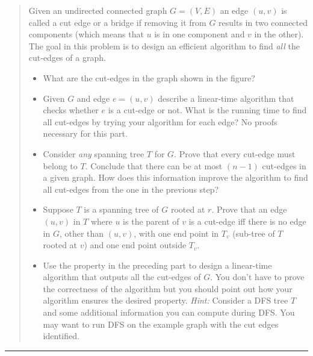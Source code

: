 \documentclass[11pt]{article}
\begin{document}



\begin{quote}

\begin{enumerate}
	Given an undirected connected graph $G=(V,E)$ an edge $(u,v)$ is
called a cut edge or a bridge if removing it from $G$ results in
two connected components (which means that $u$ is in one component
and $v$ in the other). The goal in this problem is to design an efficient
algorithm to find {\em all} the cut-edges of a graph.
  \begin{itemize}
	\item What are the cut-edges in the graph shown in the figure?	
	\item Given $G$ and edge $e=(u,v)$ describe a linear-time algorithm
	that checks whether $e$ is a cut-edge or not. What is the running time
	to find all cut-edges by trying your algorithm for each edge? No proofs
	necessary for this part.
	\item Consider {\em any} spanning tree $T$ for $G$. Prove that every
	cut-edge must belong to $T$. Conclude that there can be at most $(n-1)$
	cut-edges in a given graph. How does this information improve the 
	algorithm to find all cut-edges from the one in the previous step?
	\item Suppose $T$ is a spanning tree of $G$ rooted at $r$.
	Prove that an edge $(u,v)$ in $T$ where $u$ is
	the parent of $v$ is a cut-edge iff there is no edge in $G$, other
	than $(u,v)$, 
	with one end point in $T_v$ (sub-tree of $T$ rooted at $v$)
	and one end point outside $T_v$.
	\item Use the property in the preceding part to design a linear-time
	algorithm that outputs all the cut-edges of $G$. You don't have to 
	prove the correctness of the algorithm but you should point out how
	your algorithm ensures the desired property. {\em Hint:} Consider
	a DFS tree $T$ and some additional information you can compute
	during DFS. You may want to run DFS on the example graph with the
	cut edges identified.
\end{itemize}

\end{enumerate}

\end{quote}
\hrule
\end{document}
